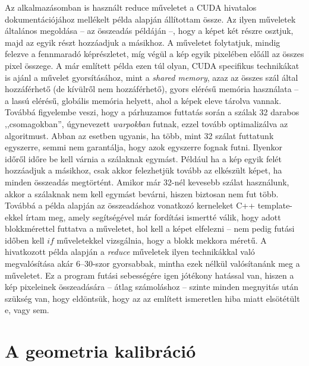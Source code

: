 \documentclass[a4paper,12pt]{article}
\begin{document}
Az alkalmazásomban is használt reduce műveletet  a CUDA hivatalos dokumentációjához mellékelt példa \cite{reduce} alapján állítottam össze. Az ilyen műveletek általános megoldása -- az összeadás példáján --, hogy a képet két részre osztjuk, majd az egyik részt hozzáadjuk a másikhoz. A műveletet folytatjuk, mindig felezve a fennmaradó képrészletet, míg végül a kép egyik pixelében előáll az összes pixel összege. A már említett példa ezen túl olyan, CUDA specifikus technikákat is ajánl a művelet gyorsításához, mint a \emph{shared memory}, azaz az összes szál által hozzáférhető (de kívülről nem hozzáférhető), gyors elérésű memória használata -- a lassú elérésű, globális memória helyett, ahol a képek eleve tárolva vannak. Továbbá figyelembe veszi, hogy a párhuzamos futtatás során a szálak 32 darabos ,,csomagokban'',  úgynevezett \emph{warpokban} futnak, ezzel tovább optimalizálva az algoritmust. Abban az esetben ugyanis, ha több, mint 32 szálat futtatunk egyszerre, semmi nem garantálja, hogy azok egyszerre fognak futni. Ilyenkor időről időre be kell várnia a szálaknak egymást. Például ha a kép egyik felét hozzáadjuk a másikhoz, csak akkor felezhetjük tovább az elkészült képet, ha minden összeadás megtörtént. Amikor már 32-nél kevesebb szálat használunk, akkor a szálaknak nem kell egymást bevárni, hiszen biztosan nem fut több. Továbbá a példa alapján az összeadáshoz vonatkozó kerneleket C++ template-ekkel írtam meg, amely segítségével már fordítási ismertté válik, hogy adott blokkmérettel futtatva a műveletet, hol kell a képet elfelezni -- nem pedig futási időben kell $if$ műveletekkel vizsgálnia, hogy a blokk mekkora méretű. A hivatkozott példa alapján a \emph{reduce} műveletek ilyen technikákkal való megvalósítása akár $6$--$30$-szor gyorsabbak, mintha ezek nélkül valósítanánk meg a műveletet. Ez a program futási sebességére igen jótékony hatással van, hiszen a kép pixeleinek összeadására -- átlag számoláshoz -- szinte minden megnyitás után szükség van, hogy eldöntsük, hogy az az említett ismeretlen hiba miatt elsötétült e, vagy sem. 




\section{A geometria kalibráció}
\label{sec:geomkalib}
\end{document}
